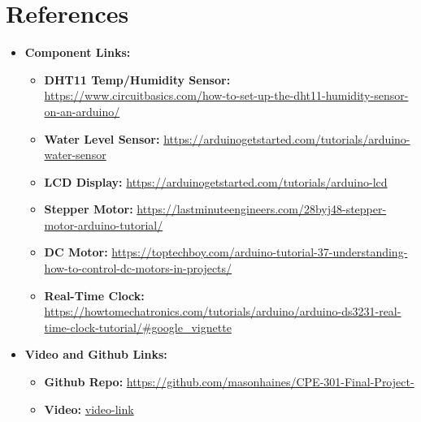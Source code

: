 \documentclass{article}
\begin{document}
\section {References}
\begin{itemize}
    \item \textbf{Component Links:}
    \begin{itemize}
        \item \textbf{DHT11 Temp/Humidity Sensor:} \url{https://www.circuitbasics.com/how-to-set-up-the-dht11-humidity-sensor-on-an-arduino/}
        \item \textbf{Water Level Sensor:} \url{https://arduinogetstarted.com/tutorials/arduino-water-sensor}
        \item \textbf{LCD Display:} \url{https://arduinogetstarted.com/tutorials/arduino-lcd}
        \item \textbf{Stepper Motor:} \url{https://lastminuteengineers.com/28byj48-stepper-motor-arduino-tutorial/}
        \item \textbf{DC Motor:} 
        \url{https://toptechboy.com/arduino-tutorial-37-understanding-how-to-control-dc-motors-in-projects/}
        \item \textbf{Real-Time Clock:} \url{https://howtomechatronics.com/tutorials/arduino/arduino-ds3231-real-time-clock-tutorial/#google_vignette}
    \end{itemize}
        \item\textbf{Video and Github Links:}
    \begin{itemize}
        \item \textbf{Github Repo:} 
        \url {https://github.com/masonhaines/CPE-301-Final-Project-}
    \end{itemize}
        \begin{itemize}
        \item \textbf{Video:} 
        \url {video-link}
    \end{itemize}
\end{itemize}


\end{document}
